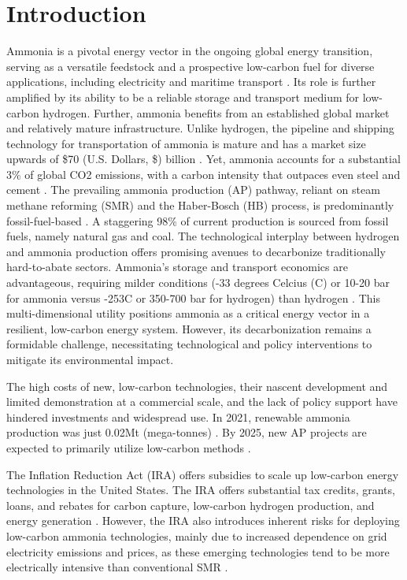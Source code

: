 \documentclass{article}
\begin{document}
\section*{Introduction}
Ammonia is a pivotal energy vector in the ongoing global energy transition, serving as a versatile feedstock and a prospective low-carbon fuel for diverse applications, including electricity and maritime transport \cite{IEA2021, IRENA2022}. Its role is further amplified by its ability to be a reliable storage and transport medium for low-carbon hydrogen. Further, ammonia benefits from an established global market and relatively mature infrastructure. Unlike hydrogen, the pipeline and shipping technology for transportation of ammonia is mature and has a market size upwards of \$70 (U.S. Dollars, \$) billion \cite{MacFarlane2020}. Yet, ammonia accounts for a substantial 3\% of global CO2 emissions, with a carbon intensity that outpaces even steel and cement \cite{IEA2021, Smith2020}. The prevailing ammonia production (AP) pathway, reliant on steam methane reforming (SMR) and the Haber-Bosch (HB) process, is predominantly fossil-fuel-based \cite{Salmon2021}. A staggering 98\% of current production is sourced from fossil fuels, namely natural gas and coal. The technological interplay between hydrogen and ammonia production offers promising avenues to decarbonize traditionally hard-to-abate sectors. Ammonia’s storage and transport economics are advantageous, requiring milder conditions (-33 degrees Celcius (C) or 10-20 bar for ammonia versus -253C or 350-700 bar for hydrogen) than hydrogen \cite{MacFarlane2020}. This multi-dimensional utility positions ammonia as a critical energy vector in a resilient, low-carbon energy system. However, its decarbonization remains a formidable challenge, necessitating technological and policy interventions to mitigate its environmental impact.

The high costs of new, low-carbon technologies, their nascent development and limited demonstration at a commercial scale, and the lack of policy support have hindered investments and widespread use. In 2021, renewable ammonia production was just 0.02Mt (mega-tonnes) \cite{IRENA2022}. By 2025, new AP projects are expected to primarily utilize low-carbon methods \cite{IRENA2022}.

The Inflation Reduction Act (IRA) offers subsidies to scale up low-carbon energy technologies in the United States. The IRA offers substantial tax credits, grants, loans, and rebates for carbon capture, low-carbon hydrogen production, and energy generation \cite{IRA2022}. However, the IRA also introduces inherent risks for deploying low-carbon ammonia technologies, mainly due to increased dependence on grid electricity emissions and prices, as these emerging technologies tend to be more electrically intensive than conventional SMR \cite{IEAGHG2017}.
\end{document}

